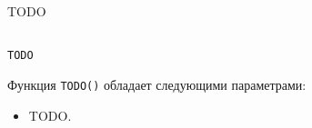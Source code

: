 
TODO



\begin{lstlisting}

TODO

\end{lstlisting}
\mylistingend

Функция \verb|TODO()| обладает следующими параметрами:

\begin{itemize}

	\item TODO.

\end{itemize}

